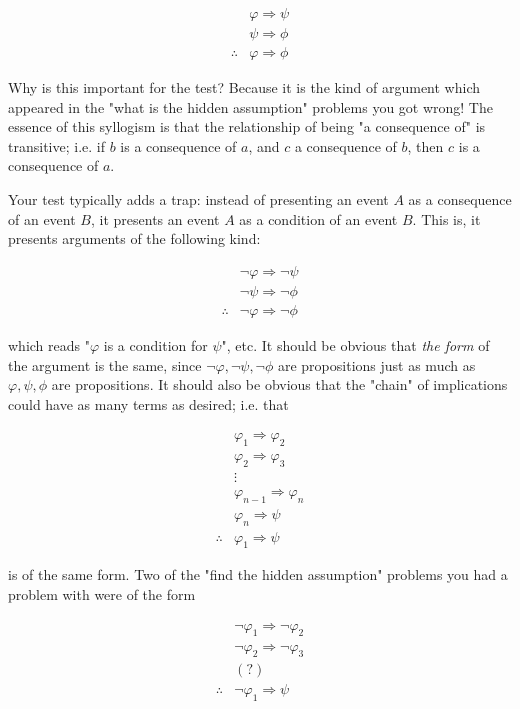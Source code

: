 \documentclass[a4paper, 12pt]{article}
\begin{document}
\begin{align*}
    &\varphi \Rightarrow \psi \\ 
    &\psi \Rightarrow \phi \\ 
    \therefore &\varphi \Rightarrow \phi
\end{align*}

Why is this important for the test? Because it is the kind of argument which
appeared in the "what is the hidden assumption" problems you got wrong! The
essence of this syllogism is that the relationship of being "a consequence of"
is transitive; i.e. if $b$ is a consequence of $a$, and $c$ a consequence of
$b$, then $c$ is a consequence of $a$.

Your test typically adds a trap: instead of presenting an event $A$ as a consequence 
of an event $B$, it presents an event $A$ as a condition of an event $B$. This is,
it presents arguments of the following kind:

\begin{align*}
    &\neg \varphi \Rightarrow \neg \psi \\ 
    &\neg \psi \Rightarrow \neg \phi \\ 
    \therefore &\neg \varphi \Rightarrow \neg \phi
\end{align*}

which reads "$\varphi$ is a condition for $\psi$", etc. It should be obvious
that \textit{the form} of the argument is the same, since $\neg \varphi, \neg
\psi, \neg \phi$ are propositions just as much as $\varphi, \psi, \phi$ 
are propositions. It should also be obvious that the "chain" of 
implications could have as many terms as desired; i.e. that 

\begin{align*}
    &\varphi_1 \Rightarrow \varphi_2 \\ 
    &\varphi_2 \Rightarrow \varphi_3 \\ 
    &\vdots \\ 
    &\varphi_{n-1} \Rightarrow \varphi_n\\
    &\varphi_{n} \Rightarrow \psi\\
    \therefore & \varphi_{1} \Rightarrow \psi
\end{align*}

is of the same form. Two of the "find the hidden assumption" problems you had a
problem with were of the form 

\begin{align*}
    &\neg \varphi_1 \Rightarrow \neg \varphi_2 \\ 
    &\neg \varphi_2 \Rightarrow \neg \varphi_3 \\ 
    &(?) \\ 
    \therefore &\neg \varphi_1 \Rightarrow \psi
\end{align*}
\end{document}
